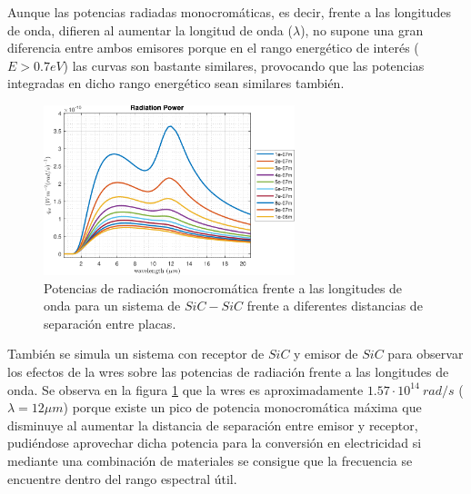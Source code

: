Aunque las potencias radiadas monocromáticas, es decir, frente a las longitudes de onda, difieren al aumentar la longitud de onda ($\lambda$), no supone una gran diferencia entre ambos emisores porque en el rango energético de interés ($E>0.7eV$) las curvas son bastante similares, provocando que las potencias integradas en dicho rango energético sean similares también.
\begin{figure}[H]
	\centering
		\includegraphics[width=0.65\textwidth]{figuras/Resultados/radiacion/SiCSiC.pdf}
	\caption{Potencias de radiación monocromática frente a las longitudes de onda para un sistema de $SiC-SiC$ frente a diferentes distancias de separación entre placas.}
	\label{fig:SiCSiC}
\end{figure}
También se simula un sistema con receptor de $SiC$ y emisor de $SiC$ para observar los efectos de la \gls{wres} sobre las potencias de radiación frente a las longitudes de onda. Se observa en la figura \ref{fig:SiCSiC} que la \gls{wres} es aproximadamente $1.57\cdot 10^{14} \ rad/s$ ($\lambda = 12\mu m$) porque existe un pico de potencia monocromática máxima que disminuye al aumentar la distancia de separación entre emisor y receptor, pudiéndose aprovechar dicha potencia para la conversión en electricidad si mediante una combinación de materiales se consigue que la frecuencia se encuentre dentro del rango espectral útil.

